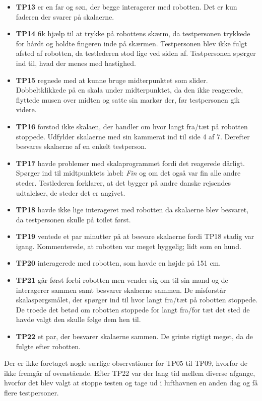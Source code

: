 \begin{itemize}
\item \textbf{TP13} er en far og søn, der begge interagerer med robotten. Det er kun faderen der svarer på skalaerne.
\item \textbf{TP14} fik hjælp til at trykke på robottens skærm, da testpersonen trykkede for hårdt og holdte fingeren inde på skærmen. Testpersonen blev ikke fulgt afsted af robotten, da testlederen stod lige ved siden af. Testpersonen spørger ind til, hvad der menes med hastighed.
\item \textbf{TP15} regnede med at kunne bruge midterpunktet som slider. Dobbeltklikkede på en skala under midterpunktet, da den ikke reagerede, flyttede musen over midten og satte sin markør der, før testpersonen gik videre.
\item \textbf{TP16} forstod ikke skalaen, der handler om hvor langt fra/tæt på robotten stoppede. Udfylder skalaerne med sin kammerat ind til side 4 af 7. Derefter besvares skalaerne af en enkelt testperson.
\item \textbf{TP17} havde problemer med skalaprogrammet fordi det reagerede dårligt. Spørger ind til midtpunktets label: \textit{Fin} og om det også var fin alle andre steder. Testlederen forklarer, at det bygger på andre danske rejsendes udtalelser, de steder det er angivet.
\item \textbf{TP18} havde ikke lige interageret med robotten da skalaerne blev besvaret, da testpersonen skulle på toilet først.
\item \textbf{TP19} ventede et par minutter på at besvare skalaerne fordi TP18 stadig var igang. Kommenterede, at robotten var meget hyggelig; lidt som en hund.
\item \textbf{TP20} interagerede med robotten, som havde en højde på 151 cm.
\item \textbf{TP21} går først forbi robotten men vender sig om til sin mand og de interagerer sammen samt besvarer skalaerne sammen. De misforstår skalaspørgsmålet, der spørger ind til hvor langt fra/tæt på robotten stoppede. De troede det betød om robotten stoppede for langt fra/for tæt det sted de havde valgt den skulle følge dem hen til.
\item \textbf{TP22} et par, der besvarer skalaerne sammen. De grinte rigtigt meget, da de fulgte efter robotten.\blankline
\end{itemize}
\noindent
%
Der er ikke foretaget nogle særlige observationer for TP05 til TP09, hvorfor de ikke fremgår af ovenstående. Efter TP22 var der lang tid mellem diverse afgange, hvorfor det blev valgt at stoppe testen og tage ud i lufthavnen en anden dag og få flere testpersoner. 

